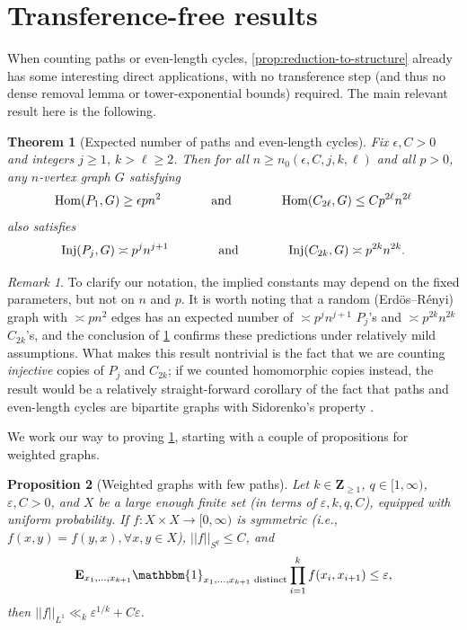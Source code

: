 \documentclass[reqno,11pt]{amsart}
\newtheorem{theorem}{Theorem}[section]
\newtheorem{proposition}[theorem]{Proposition}
\theoremstyle{definition}
\theoremstyle{remark}
\newtheorem*{remark}{Remark}
\numberwithin{equation}{section}
\newcommand{\Z}{\mathbf{Z}}
\newcommand{\E}{\mathbf{E}}
\newcommand{\one}{\mathbbm{1}}
\newcommand{\eps}{\varepsilon}
\newcommand{\Hom}{\textnormal{Hom}}
\newcommand{\Inj}{\textnormal{Inj}}
\begin{document}
\section{Transference-free results} \label{sec:transference-free}

When counting paths or even-length cycles, \cref{prop:reduction-to-structure} already has some interesting direct applications, with no transference step (and thus no dense removal lemma or tower-exponential bounds) required. The main relevant result here is the following.

\begin{theorem}[Expected number of paths and even-length cycles] \label{thm:expected-cycles-paths}
Fix $\epsilon, C > 0$ and integers $j \ge 1$, $k > \ell \ge 2$. Then for all $n \ge n_0(\epsilon, C, j, k, \ell)$ and all $p > 0$, any $n$-vertex graph $G$ satisfying
\[
    \Hom(P_1, G) \ge \epsilon p n^2 \qquad \qquad 
    \text{and} \qquad\qquad 
    \Hom(C_{2\ell}, G) \le C p^{2\ell} n^{2\ell}
\]
also satisfies
\[
    \Inj(P_{j}, G) \asymp p^{j} n^{j+1} 
    \qquad\qquad \text{and} 
    \qquad\qquad \Inj(C_{2k},G) \asymp p^{2k} n^{2k}.
\]
\end{theorem}

\begin{remark}
To clarify our notation, the implied constants may depend on the fixed parameters, but not on $n$ and $p$. It is worth noting that a random (Erd\"os--R\'enyi) graph with $\asymp pn^2$ edges has an expected number of $\asymp p^j n^{j+1}$ $P_j$'s and $\asymp p^{2k} n^{2k}$ $C_{2k}$'s, and the conclusion of \cref{thm:expected-cycles-paths} confirms these predictions under relatively mild assumptions. What makes this result nontrivial is the fact that we are counting \emph{injective} copies of $P_j$ and $C_{2k}$; if we counted homomorphic copies instead, the result would be a relatively straight-forward corollary of the fact that paths and even-length cycles are bipartite graphs with Sidorenko's property \cite{sidorenko1991inequalities}.
\end{remark}

We work our way to proving \cref{thm:expected-cycles-paths}, starting with a couple of propositions for weighted graphs.


\begin{proposition}[Weighted graphs with few paths] \label{prop:few-paths}
Let $k \in \Z_{\ge 1}$, $q \in [1, \infty)$, $\eps, C > 0$, and $X$ be a large enough finite set (in terms of $\eps, k, q, C$), equipped with uniform probability. If $f : X \times X \to [0, \infty)$ is symmetric (i.e., $f(x, y) = f(y, x), \forall x, y \in X$), $||f||_{S^q} \le C$, and
\[
    \E_{x_1,\ldots,x_{k+1}} \one_{x_1,\ldots,x_{k+1} \textnormal{ distinct}} \prod_{i=1}^k f(x_i, x_{i+1}) \le \eps,
\]
then $||f||_{L^1} \ll_k \eps^{1/k} + C\eps$.
\end{proposition}
\end{document}
